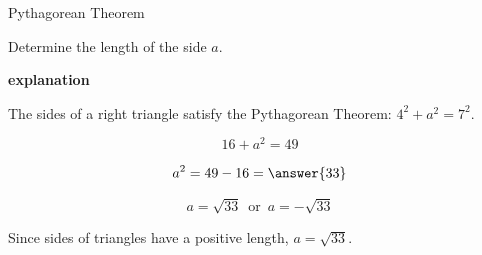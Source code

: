 \documentclass{ximera}
\begin{document}
\begin{example} Pythagorean Theorem




Determine the length of the side $a$. 






\begin{image}[3in]
  \end{image}



\textbf{\textcolor{red!75!green}{explanation}} 

The sides of a right triangle satisfy the Pythagorean Theorem: $4^2 + a^2 = 7^2$.


\[  16 + a^2 = 49       \]

\[  a^2 = 49 - 16 = \answer{33}     \]

\[  a = \sqrt{33} \, \text{ or } \, a = -\sqrt{33}    \]



Since sides of triangles have a positive length, $a = \sqrt{33}$.








\end{example}
\end{document}
